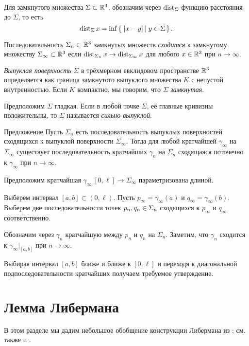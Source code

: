 \documentclass[a4paper,10pt]{article}
\begin{document}
Для замкнутого множества $\Sigma\subset \mathbb{R}^3$,
обозначим через $\operatorname{dist}_\Sigma$ функцию расстояния до $\Sigma$,
то есть
\[\dist_\Sigma x=\inf\set{|x-y|}{y\in\Sigma}.\]

Последовательность $\Sigma_n\subset \mathbb{R}^3$ замкнутых множеств 
\emph{сходится} к замкнутому множеству $\Sigma_\infty\subset \mathbb{R}^3$ 
если 
$\operatorname{dist}_{\Sigma_n}x\to\operatorname{dist}_{\Sigma_\infty}x$ для любого $x\in\mathbb{R}^3$ при $n\to\infty$.


\emph{Выпуклая поверхность} $\Sigma$ в трёхмерном евклидовом пространстве  $\mathbb{R}^3$ определяется как граница замкнутого выпуклого множества $K$ с непустой внутренностью.
Если $K$ компактно, мы говорим, что $\Sigma$ \emph{замкнутая}.

Предположим $\Sigma$ гладкая.
Если в любой точке $\Sigma$, 
её главные кривизны положительны, 
то $\Sigma$ называется \emph{сильно выпуклой}. 

\begin{thm}{Предложение}\label{prop:convegence}
Пусть $\Sigma_n$ есть последовательность выпуклых поверхностей сходящихся к выпуклой поверхности $\Sigma_\infty$.
Тогда для любой кратчайшей $\gamma_\infty$ на $\Sigma_\infty$ 
существует последовательность кратчайших $\gamma_n$ на $\Sigma_n$ сходящаяся поточечно к $\gamma_\infty$ при $n\to \infty$.
\end{thm}

Предположим кратчайшая $\gamma_\infty\:[0,\ell]\to\Sigma_\infty$ параметризована длиной.

Выберем интервал $[a,b]\subset (0,\ell)$.
Пусть $p_\infty=\gamma_\infty(a)$ и $q_\infty=\gamma_\infty(b)$.
Выберем две последовательности точек $p_n,q_n\zz\in\Sigma_n$ сходящихся к $p_\infty$ и $q_\infty$ соответственно.

Обозначим через $\gamma_n$ кратчайшую между $p_n$ и $q_n$ на $\Sigma_n$.
Заметим, что $\gamma_n$ сходится к $\gamma_\infty|_{[a,b]}$
при $n\to\infty$.

Выбирая интервал $[a,b]$ ближе и ближе к $[0,\ell]$ и переходя к диагональной подпоследовательности кратчайших получаем требуемое утверждение.
\qeds

\section{Лемма Либермана}

В этом разделе мы дадим небольшое обобщение конструкции Либермана из \cite{liberman};
см. также \cite{milka-liberman} и \cite{petrunin}.
\end{document}
